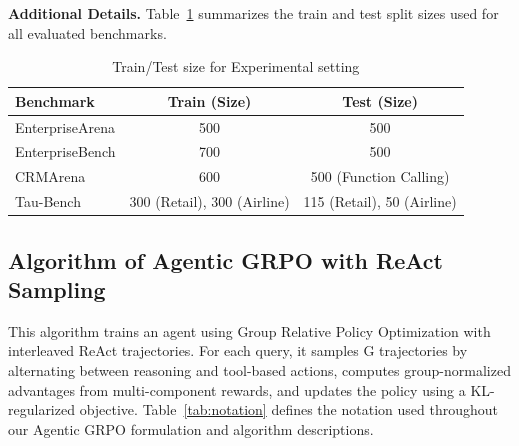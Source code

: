 \documentclass{article}
\theoremstyle{plain}
\theoremstyle{definition}
\theoremstyle{remark}
\begin{document}
\noindent \textbf{Additional Details.}
Table~\ref{tab:experiment_data} summarizes the train and test split sizes used for all evaluated benchmarks.


\begin{table}[H]
\centering
\caption{Train/Test size for Experimental setting}
\label{tab:experiment_data}
\begin{tabular}{l c c}
\toprule
\textbf{Benchmark} & \textbf{Train (Size)} & \textbf{Test (Size)} \\
\midrule
EnterpriseArena    & 500                & 500 \\
EnterpriseBench    & 700                 & 500 \\
CRMArena           & 600                   & 500 (Function Calling) \\
Tau-Bench          & 300 (Retail), 300 (Airline)                   & 115 (Retail), 50 (Airline) \\
\bottomrule
\end{tabular}
\end{table}






\subsection{Algorithm of Agentic GRPO with ReAct Sampling}
\label{app:algo}
This algorithm trains an agent using Group Relative Policy Optimization with interleaved ReAct trajectories. For each query, it samples G trajectories by alternating between reasoning and tool-based actions, computes group-normalized advantages from multi-component rewards, and updates the policy using a KL-regularized objective.
Table~\ref{tab:notation} defines the notation used throughout our Agentic GRPO formulation and algorithm descriptions.
\end{document}
